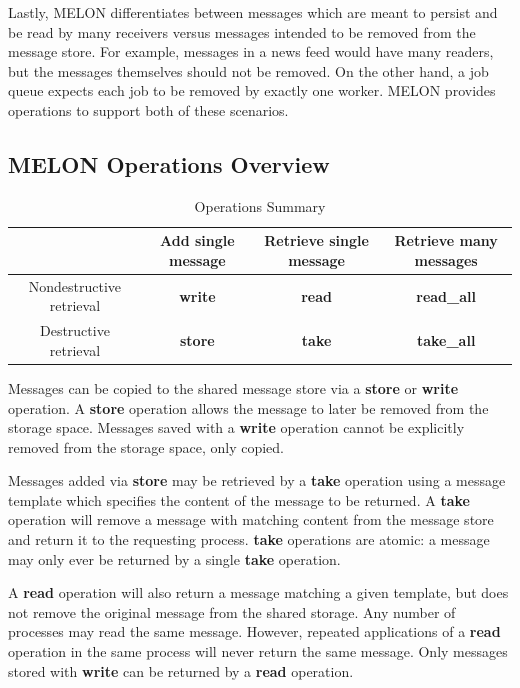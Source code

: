 \documentclass[lnicst]{svmultln}
\begin{document}
Lastly, MELON differentiates between messages which are meant to persist and be read by many receivers versus messages intended to be removed from the message store. For example, messages in a news feed would have many readers, but the messages themselves should not be removed. On the other hand, a job queue expects each job to be removed by exactly one worker. MELON provides operations to support both of these scenarios.

\subsection{MELON Operations Overview}

\begin{table}
\centering
\caption{Operations Summary}
\begin{tabular}{|c|c|c|c|} \hline
& Add single message & Retrieve single message & Retrieve many messages \\ \hline
Nondestructive retrieval & \textbf{write} & \textbf{read} & \textbf{read\_all} \\ \hline
Destructive retrieval & \textbf{store} & \textbf{take} & \textbf{take\_all} \\ \hline
\end{tabular}
\label{table:opsummary}
\end{table}

Messages can be copied to the shared message store via a \textbf{store} or \textbf{write} operation. A \textbf{store} operation allows the message to later be removed from the storage space. Messages saved with a \textbf{write} operation cannot be explicitly removed from the storage space, only copied.

Messages added via \textbf{store} may be retrieved by a \textbf{take} operation using a message template which specifies the content of the message to be returned. A \textbf{take} operation will remove a message with matching content from the message store and return it to the requesting process. \textbf{take} operations are atomic: a message may only ever be returned by a single \textbf{take} operation.

A \textbf{read} operation will also return a message matching a given template, but does not remove the original message from the shared storage. Any number of processes may read the same message. However, repeated applications of a \textbf{read} operation in the same process will never return the same message. Only messages stored with \textbf{write} can be returned by a \textbf{read} operation.
\end{document}
